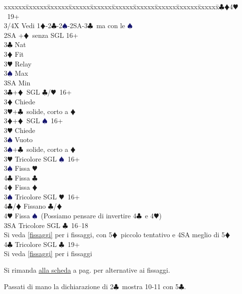 \documentclass[a4paper,italian]{article}
\newcommand{\BC}{\textcolor{OliveGreen}{$\clubsuit$}}
\newcommand{\BD}{\textcolor{RedOrange}{$\vardiamondsuit$}}
\newcommand{\BH}{\textcolor{Red2}{$\varheartsuit${}}}
\newcommand{\BS}{\textcolor{MidnightBlue}{$\spadesuit${}}}
\newenvironment{bidtable}
{\begin{tabbing}

    xxxxxx\=xxxxxx\=xxxxxx\=xxxxxx\=xxxxxx\=xxxxxx\=xxxxxx\=xxxxxx\=xxxxxx\=xxxxxx\=\kill}
{\end{tabbing} }%
\begin{document}
\begin{bidtable}
    4\BC {}\BD 4\BH\ 19+\-\-\\
    3/4X \> Vedi 1\BD -2\BC -2\BS -2SA-3\BC\ ma con le \BS \-\-\\
    2SA +\BD\ senza SGL 16+\+\\
    3\BC \> Nat\\
    3\BD \> Fit\\
    3\BH \> Relay\+\\
    3\BS \> Max\\
    3SA \> Min\-\-\\
    3\BC {}+\BD\ SGL \BC /\BH\ 16+\+\\
    3\BD \> Chiede\\
    3\BH {}+\BC\ solide, corto a \BD \-\\
    3\BD {}+\BD\ SGL \BS\ 16+\+\\
    3\BH \> Chiede\+\\
    3\BS \> Vuoto\-\\
    3\BS {}+\BC\ solide, corto a \BD \-\\
    3\BH \> Tricolore SGL \BS\ 16+\+\\
    3\BS \> Fissa \BH \\
    4\BC \> Fissa \BC \\
    4\BD \> Fissa \BD \-\\
    3\BS \> Tricolore SGL \BH\ 16+\+\\
    4\BC/\BD \> Fissano \BC /\BD \\
    4\BH \> Fissa \BS\ (Possiamo pensare di invertire 4\BC\ e 4\BH )\-\\
    3SA \> Tricolore SGL \BC\ 16--18\+\\
    Si veda \ref{fissaggi} per i fissaggi, con 5\BD\ piccolo tentativo e 4SA meglio di 5\BD\-\\
    4\BC \> Tricolore SGL \BC\ 19+\+\\
    Si veda \ref{fissaggi} per i fissaggi\-\-
\end{bidtable}
\bigbreak
Si rimanda \hyperref[fissaggi]{alla scheda} a pag. \pageref{fissaggi} per alternative ai fissaggi.

Passati di mano la dichiarazione di 2\BC\ mostra 10-11 con 5\BC .
\end{document}
